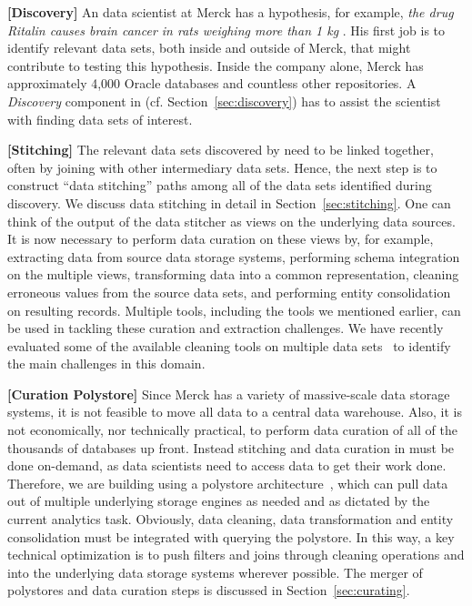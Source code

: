 {\bf[Discovery]} An data scientist at Merck has a hypothesis, for example, {\it the drug Ritalin causes brain cancer in rats weighing more than 1 kg }.  His first job is to identify relevant data sets, both inside and outside of Merck, that might contribute to testing this hypothesis.  Inside the company alone, Merck has approximately  4,000 Oracle databases and countless other repositories.  A {\it Discovery} component in \dcv (cf. Section~\ref{sec:discovery}) has to assist the scientist with finding data sets of interest.

{\bf[Stitching]} The relevant data sets discovered by \dcv  need to be  linked together, often by joining with other intermediary data sets.  Hence, the next step is to construct ``data stitching'' paths among all of the data sets identified during discovery.  We discuss data stitching in detail 
in Section~\ref{sec:stitching}. One can think of the output of the data stitcher as views on the underlying data sources. It is now necessary to perform data curation on these views by, for example, extracting data from source data storage systems, performing schema integration on the multiple views, transforming data into a common representation, cleaning erroneous values from the source data sets, and performing entity consolidation on resulting records. Multiple tools, including the tools we mentioned earlier, can be used in tackling these curation and extraction challenges. We have recently evaluated some of the available cleaning tools on multiple data sets~\cite{evaluatioin} to identify the main challenges in this domain.

{\bf[Curation Polystore]} Since Merck has a variety of massive-scale data storage systems, it is  not feasible to move all data to a  central data warehouse. Also, it is not economically, nor technically practical, to perform data curation of all of the thousands of databases up front.
 Instead stitching and data curation in \dcv must be done on-demand, as data scientists need to access data to get
their work done.  Therefore, we are building \dcv using a polystore architecture~\cite{DBLP:journals/sigmod/DugganESBHKMMMZ15}, which  can pull data out of multiple underlying storage engines as needed and as dictated by the current analytics task.  Obviously, data cleaning, data transformation and entity consolidation must be integrated with querying the polystore.  In this way, a key technical optimization is to push filters and joins through cleaning operations and into the underlying data storage systems wherever possible.  The
merger of polystores and data curation steps is discussed in Section~\ref{sec:curating}.

